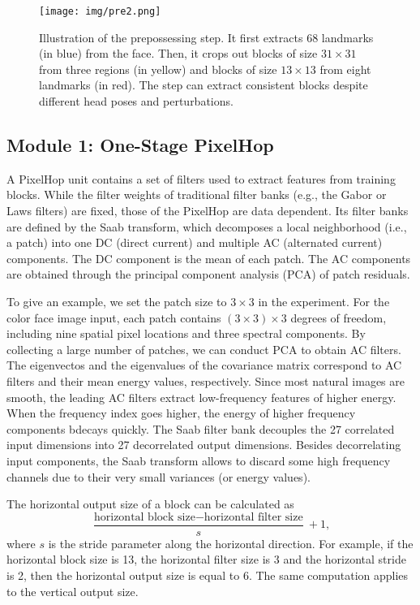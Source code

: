 \documentclass[main, biber]{now-journal}
\begin{document}
\begin{figure}[!t]
\centering
\texttt{[image: img/pre2.png]}
\caption{Illustration of the prepossessing step. It first extracts 68 landmarks (in blue)
from the face. Then, it crops out blocks of size $31 \times 31$ from three regions
(in yellow) and blocks of size $13 \times 13$ from eight landmarks (in red). The step
can extract consistent blocks despite different head poses and perturbations. }\label{fig_pre}
\end{figure}

\subsection{Module 1: One-Stage PixelHop}

A PixelHop unit \citep{chen2019pixelhop, chen2020pixelhop++} contains a
set of filters used to extract features from training blocks. While the
filter weights of traditional filter banks (e.g., the Gabor or Laws
filters) are fixed, those of the PixelHop are data dependent. Its filter
banks are defined by the Saab transform, which decomposes a local
neighborhood (i.e., a patch) into one DC (direct current) and multiple
AC (alternated current) components. The DC component is the mean of each
patch. The AC components are obtained through the principal component
analysis (PCA) of patch residuals.  

To give an example, we set the patch size to $3 \times 3$ in the
experiment.  For the color face image input, each patch contains $(3
\times 3) \times 3$ degrees of freedom, including nine spatial pixel
locations and three spectral components. By collecting a large number of
patches, we can conduct PCA to obtain AC filters.  The eigenvectos and
the eigenvalues of the covariance matrix correspond to AC filters and
their mean energy values, respectively. Since most natural images are
smooth, the leading AC filters extract low-frequency features of higher
energy. When the frequency index goes higher, the energy of higher
frequency components bdecays quickly.  The Saab filter bank decouples the
27 correlated input dimensions into 27 decorrelated output dimensions.
Besides decorrelating input components, the Saab transform allows to
discard some high frequency channels due to their very small variances
(or energy values). 

The horizontal output size of a block can be calculated as
\begin{equation}
\frac{\mbox{horizontal block size} - \mbox{horizontal filter size}}{s} + 1,
\end{equation}
where $s$ is the stride parameter along the horizontal direction.  For
example, if the horizontal block size is 13, the horizontal filter size
is 3 and the horizontal stride is 2, then the horizontal output size is
equal to 6. The same computation applies to the vertical output size. 
\end{document}
